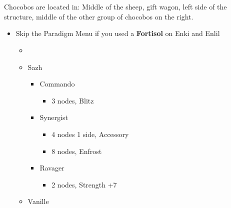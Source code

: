 \chapter[Chapter 8]{}

\begin{multicols}{2}
	Chocobos are located in: Middle of the sheep, gift wagon, left side of the structure, middle of the other group of chocobos on the right.
	\begin{menu}
		\begin{itemize}
			\item Skip the Paradigm Menu if you used a \textbf{Fortisol} on Enki and Enlil
			      \paradigm
			      \begin{itemize}
				      \item {}%
				            {\paradigmline[1]{\textit{\com}}{\textit{\rav}}{}}%
				            {\paradigmline{(\com)}{(\med)}{}}%
				            {\paradigmline{\syn}{\sab}{}}%
				            {\paradigmline{\rav}{\rav}{}}%
				            {\paradigmline{\rav}{\sab}{}}%
				            {\paradigmline{\com}{\sab}{}}
			      \end{itemize}
			      \crystarium
			      \begin{itemize}
				      \item Sazh
				            \begin{itemize}
					            \item Commando
					                  \begin{itemize}
						                  \item 3 nodes, Blitz
					                  \end{itemize}
					            \item Synergist
					                  \begin{itemize}
						                  \item 4 nodes 1 side, Accessory
						                  \item 8 nodes, Enfrost
					                  \end{itemize}
					            \item Ravager
					                  \begin{itemize}
						                  \item 2 nodes, Strength +7
					                  \end{itemize}
				            \end{itemize}
				      \item Vanille

\end{itemize}
\end{itemize}
\end{menu}
\end{multicols}
